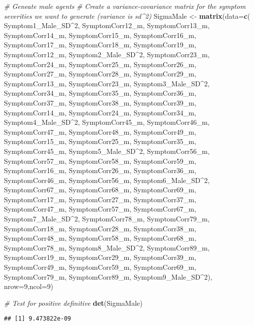 \documentclass[]{article}
\newenvironment{Shaded}{\begin{snugshade}}{\end{snugshade}}
\newcommand{\KeywordTok}[1]{\textcolor[rgb]{0.13,0.29,0.53}{\textbf{#1}}}
\newcommand{\DataTypeTok}[1]{\textcolor[rgb]{0.13,0.29,0.53}{#1}}
\newcommand{\DecValTok}[1]{\textcolor[rgb]{0.00,0.00,0.81}{#1}}
\newcommand{\StringTok}[1]{\textcolor[rgb]{0.31,0.60,0.02}{#1}}
\newcommand{\CommentTok}[1]{\textcolor[rgb]{0.56,0.35,0.01}{\textit{#1}}}
\newcommand{\OperatorTok}[1]{\textcolor[rgb]{0.81,0.36,0.00}{\textbf{#1}}}
\newcommand{\NormalTok}[1]{#1}
\begin{document}
\begin{Shaded}
\begin{Highlighting}[]
\CommentTok{# Geneate male agents}
\CommentTok{# Create a variance-covariance matrix for the symptom severities we want to generate (variance is sd^2)}
\NormalTok{SigmaMale <-}\StringTok{ }\KeywordTok{matrix}\NormalTok{(}\DataTypeTok{data=}\KeywordTok{c}\NormalTok{(}
\NormalTok{  Symptom1_Male_SD}\OperatorTok{^}\DecValTok{2}\NormalTok{, SymptomCorr12_m, SymptomCorr13_m, SymptomCorr14_m, SymptomCorr15_m, SymptomCorr16_m, SymptomCorr17_m, SymptomCorr18_m, SymptomCorr19_m,}
\NormalTok{  SymptomCorr12_m, Symptom2_Male_SD}\OperatorTok{^}\DecValTok{2}\NormalTok{, SymptomCorr23_m, SymptomCorr24_m, SymptomCorr25_m, SymptomCorr26_m, SymptomCorr27_m, SymptomCorr28_m, SymptomCorr29_m,}
\NormalTok{  SymptomCorr13_m, SymptomCorr23_m, Symptom3_Male_SD}\OperatorTok{^}\DecValTok{2}\NormalTok{, SymptomCorr34_m, SymptomCorr35_m, SymptomCorr36_m, SymptomCorr37_m, SymptomCorr38_m, SymptomCorr39_m,}
\NormalTok{  SymptomCorr14_m, SymptomCorr24_m, SymptomCorr34_m, Symptom4_Male_SD}\OperatorTok{^}\DecValTok{2}\NormalTok{, SymptomCorr45_m, SymptomCorr46_m, SymptomCorr47_m, SymptomCorr48_m, SymptomCorr49_m,}
\NormalTok{  SymptomCorr15_m, SymptomCorr25_m, SymptomCorr35_m, SymptomCorr45_m, Symptom5_Male_SD}\OperatorTok{^}\DecValTok{2}\NormalTok{, SymptomCorr56_m, SymptomCorr57_m, SymptomCorr58_m, SymptomCorr59_m,}
\NormalTok{  SymptomCorr16_m, SymptomCorr26_m, SymptomCorr36_m, SymptomCorr46_m, SymptomCorr56_m, Symptom6_Male_SD}\OperatorTok{^}\DecValTok{2}\NormalTok{, SymptomCorr67_m, SymptomCorr68_m, SymptomCorr69_m,}
\NormalTok{  SymptomCorr17_m, SymptomCorr27_m, SymptomCorr37_m, SymptomCorr47_m, SymptomCorr57_m, SymptomCorr67_m, Symptom7_Male_SD}\OperatorTok{^}\DecValTok{2}\NormalTok{, SymptomCorr78_m, SymptomCorr79_m,}
\NormalTok{  SymptomCorr18_m, SymptomCorr28_m, SymptomCorr38_m, SymptomCorr48_m, SymptomCorr58_m, SymptomCorr68_m, SymptomCorr78_m, Symptom8_Male_SD}\OperatorTok{^}\DecValTok{2}\NormalTok{, SymptomCorr89_m,}
\NormalTok{  SymptomCorr19_m, SymptomCorr29_m, SymptomCorr39_m, SymptomCorr49_m, SymptomCorr59_m, SymptomCorr69_m, SymptomCorr79_m, SymptomCorr89_m, Symptom9_Male_SD}\OperatorTok{^}\DecValTok{2}\NormalTok{),     }
  \DataTypeTok{nrow=}\DecValTok{9}\NormalTok{,}\DataTypeTok{ncol=}\DecValTok{9}\NormalTok{)}

\CommentTok{# Test for positive definitive}
\KeywordTok{det}\NormalTok{(SigmaMale)}
\end{Highlighting}
\end{Shaded}

\begin{verbatim}
## [1] 9.473822e-09
\end{verbatim}
\end{document}
